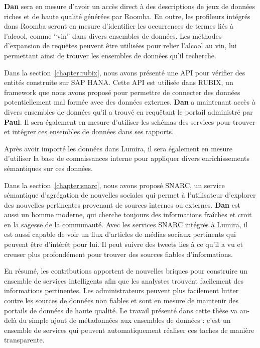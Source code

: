\textbf{Dan} sera en mesure d'avoir un acc\`{e}s direct \`{a} des descriptions de jeux de donn\'{e}es riches et de haute qualit\'{e} g\'{e}n\'{e}r\'{e}es par Roomba. En outre, les profileurs int\'{e}gr\'{e}s dans Roomba seront en mesure d'identifier les occurrences de termes li\'{e}s \`{a} l'alcool, comme ``vin'' dans divers ensembles de donn\'{e}es. Les m\'{e}thodes d'expansion de requ\^{e}tes peuvent \^{e}tre utilis\'{e}es pour relier l'alcool au vin, lui permettant ainsi de trouver les ensembles de donn\'{e}es qu'il recherche.

Dans la section~\ref{chapter:rubix}, nous avons pr\'{e}sent\'{e} une API pour v\'{e}rifier des entit\'{e}s construite sur SAP HANA. Cette API est utilis\'{e}e dans RUBIX, un framework que nous avons propos\'{e} pour permettre de connecter des donn\'{e}es potentiellement mal form\'{e}e avec des donn\'{e}es externes.
\textbf{Dan} a maintenant acc\`{e}s \`{a} divers ensembles de donn\'{e}es qu'il a trouv\'{e} en requ\^{e}tant le portail administr\'{e} par \textbf{Paul}. Il sera \'{e}galement en mesure d'utiliser les sch\'{e}mas des services pour trouver et int\'{e}grer ces ensembles de donn\'{e}es dans ses rapports.

Apr\`{e}s avoir import\'{e} les donn\'{e}es dans Lumira, il sera \'{e}galement en mesure d'utiliser la base de connaissances interne pour appliquer divers enrichissements s\'{e}mantiques sur ces donn\'{e}es.

Dans la section~\ref{chapter:snarc}, nous avons propos\'{e} SNARC, un service s\'{e}mantique d'agr\'{e}gation de nouvelles sociales qui permet \`{a} l'utilisateur d'explorer des nouvelles pertinentes provenant de sources internes ou externes. \textbf{ Dan} est aussi un homme moderne, qui cherche toujours des informations fraîches et croit en la sagesse de la communaut\'{e}. Avec les services SNARC int\'{e}gr\'{e}s \`{a} Lumira, il est aussi capable de voir un flux d'articles de m\'{e}dias sociaux pertinents qui peuvent \^{e}tre d'int\'{e}r\^{e}t pour lui. Il peut suivre des tweets lies \`{a} ce qu'il a vu et creuser plus profond\'{e}ment pour trouver des sources fiables d'informations.

En r\'{e}sum\'{e}, les contributions apportent de nouvelles briques pour construire un ensemble de services intelligents afin que les analystes trouvent facilement des informations pertinentes. Les administrateurs peuvent plus facilement lutter contre les sources de donn\'{e}es non fiables et sont en mesure de maintenir des portails de donn\'{e}es de haute qualit\'{e}. Le travail pr\'{e}sent\'{e} dans cette th\`{e}se va au-del\`{a} du simple ajout de m\'{e}tadonn\'{e}es aux ensembles de donn\'{e}es : c'est un ensemble de services qui peuvent automatiquement r\'{e}aliser ces taches de mani\`{e}re transparente.

